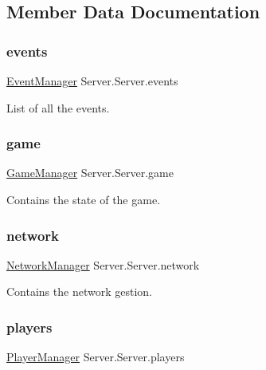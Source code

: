 \subsection{Member Data Documentation}
\mbox{\label{class_server_1_1_server_aa40e6489cb599b3a2e651794468adb55}} 
\subsubsection{\texorpdfstring{events}{events}}
{\footnotesize\ttfamily \hyperlink{class_server_1_1_event_manager}{Event\+Manager} Server.\+Server.\+events}

List of all the events. \mbox{\label{class_server_1_1_server_a51d909a4a359caec248274776756af39}} 
\subsubsection{\texorpdfstring{game}{game}}
{\footnotesize\ttfamily \hyperlink{class_server_1_1_game_manager}{Game\+Manager} Server.\+Server.\+game}

Contains the state of the game. \mbox{\label{class_server_1_1_server_a1bf9e09369666a2aac8968f74e45f6ad}} 
\subsubsection{\texorpdfstring{network}{network}}
{\footnotesize\ttfamily \hyperlink{class_server_1_1_network_manager}{Network\+Manager} Server.\+Server.\+network}

Contains the network gestion. \mbox{\label{class_server_1_1_server_a928d460f653e48aaa9c97ca77fc12a63}} 
\subsubsection{\texorpdfstring{players}{players}}
{\footnotesize\ttfamily \hyperlink{class_server_1_1_player_manager}{Player\+Manager} Server.\+Server.\+players}


